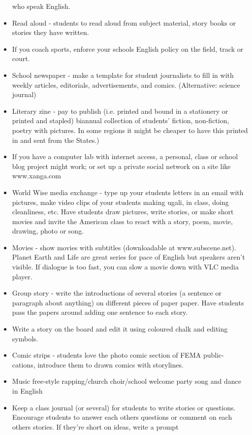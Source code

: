 \begin{itemize}
who speak English.  
\item Read aloud - students to read aloud from subject material, story books
or stories they have written.  
\item If you coach sports, enforce your schools English policy on the field,
track or court. 
\item School newspaper - make a template for student journalists to fill
in with weekly articles, editorials, advertisements, and comics. (Alternative:
science journal)  
\item Literary zine - pay to publish (i.e. printed and bound in a stationery
or printed and stapled) biannual collection of students' fiction,
non-fiction, poetry with pictures. In some regions it might be cheaper
to have this printed in and sent from the States.)  
\item If you have a computer lab with internet access, a personal, class
or school blog project might work; or set up a private social network
on a site like www.xanga.com 
\item World Wise media exchange - type up your students letters in an email
with pictures, make video clips of your students making ugali, in
class, doing cleanliness, etc. Have students draw pictures, write
stories, or make short movies and invite the American class to react
with a story, poem, movie, drawing, photo or song. 
\item Movies - show movies with subtitles (downloadable at www.subscene.net).
Planet Earth and Life are great series for pace of English but speakers
aren't visible. If dialogue is too fast, you can slow a movie down
with VLC media player.
\item Group story - write the introductions of several stories (a sentence
or paragraph about anything) on different pieces of paper paper. Have
students pass the papers around adding one sentence to each story. 
\item Write a story on the board and edit it using coloured chalk and editing
symbols. 
\item Comic strips - students love the photo comic section of FEMA public-
cations, introduce them to drawn comics with storylines.  
\item Music free-style rapping/church choir/school welcome party song and
dance in English 
\item Keep a class journal (or several) for students to write stories or
questions. Encourage students to answer each others questions or comment
on each others stories. If they're short on ideas, write a prompt

\end{itemize}
